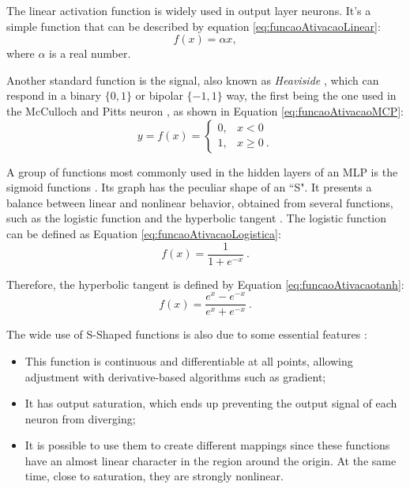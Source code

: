 The linear activation function is widely used in output layer neurons. It's a simple function that can be described by equation \ref{eq:funcaoAtivacaoLinear}: \begin{equation}
	\label{eq:funcaoAtivacaoLinear}
	f(x) = \alpha x,
\end{equation}
\noindent where $\alpha$ is a real number.

Another standard function is the signal, also known as \textit{Heaviside} \cite{haykin}, which can respond in a binary $\{0, 1\}$ or bipolar $\{-1, 1\}$ way, the first being the one used in the McCulloch and Pitts neuron \cite{McCulloch1990}, as shown in Equation \ref{eq:funcaoAtivacaoMCP}:
\begin{equation}
	\label{eq:funcaoAtivacaoMCP}
	y = f(x) = \left\{\begin{matrix}
		0, & x < 0    \\
		1, & x \geq 0 \: .
	\end{matrix}\right.
\end{equation}

A group of functions most commonly used in the hidden layers of an MLP is the sigmoid functions \cite{haykin, Castro2006FundamentalsON}. Its graph has the peculiar shape of an ``S". It presents a balance between linear and nonlinear behavior, obtained from several functions, such as the logistic function and the hyperbolic tangent \cite{Jeffrey2008}. The logistic function can be defined as Equation \ref{eq:funcaoAtivacaoLogistica}:
\begin{equation}
	\label{eq:funcaoAtivacaoLogistica}
	f(x) = \frac{1}{1 + e^{-x}}\:.
\end{equation}

Therefore, the hyperbolic tangent is defined by Equation \ref{eq:funcaoAtivacaotanh}:
\begin{equation}
\label{eq:funcaoAtivacaotanh}
	f(x) = \frac{e^x - e^{-x}}{e^x + e^{-x}}\:.
\end{equation}

The wide use of S-Shaped functions is also due to some essential features \cite{Menon1996}:

\begin{itemize}
    \item This function is continuous and differentiable at all points, allowing adjustment with derivative-based algorithms such as gradient;
    \item It has output saturation, which ends up preventing the output signal of each neuron from diverging;
    \item It is possible to use them to create different mappings since these functions have an almost linear character in the region around the origin. At the same time, close to saturation, they are strongly nonlinear.
\end{itemize}


